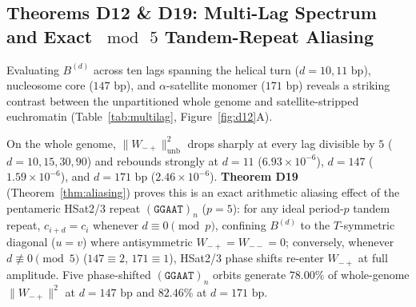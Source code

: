 \documentclass[11pt,a4paper]{article}
\newcommand{\Wmp}{W_{-+}}
\newcommand{\Wmm}{W_{--}}
\begin{document}
\subsection{Theorems D12 \& D19: Multi-Lag Spectrum and Exact $\bmod\,5$ Tandem-Repeat Aliasing}
Evaluating $B^{(d)}$ across ten lags spanning the helical turn ($d=10,11\text{ bp}$), nucleosome core ($147\text{ bp}$), and $\alpha$-satellite monomer ($171\text{ bp}$) reveals a striking contrast between the unpartitioned whole genome and satellite-stripped euchromatin (Table~\ref{tab:multilag}, Figure~\ref{fig:d12}A).

On the whole genome, $\|\Wmp\|^2_{\mathrm{unb}}$ drops sharply at every lag divisible by $5$ ($d=10,15,30,90$) and rebounds strongly at $d=11$ ($6.93\times 10^{-6}$), $d=147$ ($1.59\times 10^{-6}$), and $d=171\text{ bp}$ ($2.46\times 10^{-6}$). \textbf{Theorem D19} (Theorem~\ref{thm:aliasing}) proves this is an exact arithmetic aliasing effect of the pentameric HSat2/3 repeat $(\texttt{GGAAT})_n$ ($p=5$): for any ideal period-$p$ tandem repeat, $c_{i+d}=c_i$ whenever $d \equiv 0 \pmod p$, confining $B^{(d)}$ to the $T$-symmetric diagonal ($u=v$) where antisymmetric $\Wmp=\Wmm=0$; conversely, whenever $d \not\equiv 0 \pmod 5$ ($147 \equiv 2$, $171 \equiv 1$), HSat2/3 phase shifts re-enter $\Wmp$ at full amplitude. Five phase-shifted $(\texttt{GGAAT})_n$ orbits generate $78.00\%$ of whole-genome $\|\Wmp\|^2$ at $d=147\text{ bp}$ and $82.46\%$ at $d=171\text{ bp}$.
\end{document}
